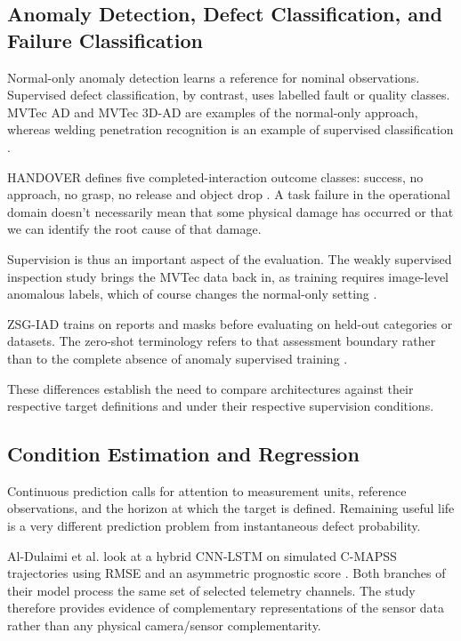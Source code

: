 \subsection{Anomaly Detection, Defect Classification, and Failure Classification}

Normal-only anomaly detection learns a reference for nominal observations. Supervised defect
classification, by contrast, uses labelled fault or quality classes. MVTec AD and MVTec 3D-AD are
examples of the normal-only approach, whereas welding penetration recognition is an example of
supervised classification \citep{Bergmann2019MVTec,Bergmann2022The,Hua2026Weld}.

HANDOVER defines five completed-interaction outcome classes: success, no approach, no grasp, no
release and object drop \citep{Thoduka2024Handover}. A task failure in the operational domain
doesn't necessarily mean that some physical damage has occurred or that we can identify the root
cause of that damage.

Supervision is thus an important aspect of the evaluation. The weakly supervised inspection study
brings the MVTec data back in, as training requires image-level anomalous labels, which of course
changes the normal-only setting \citep[PDF p.~8]{P035}.

ZSG-IAD trains on reports and masks before evaluating on held-out categories or datasets. The
zero-shot terminology refers to that assessment boundary rather than to the complete absence of
anomaly supervised training \citep[PDF pp.~6, 8--9]{P025}.

These differences establish the need to compare architectures against their respective target
definitions and under their respective supervision conditions.

\subsection{Condition Estimation and Regression}

Continuous prediction calls for attention to measurement units, reference observations, and the
horizon at which the target is defined. Remaining useful life is a very different prediction problem
from instantaneous defect probability.

Al-Dulaimi et al. look at a hybrid CNN-LSTM on simulated C-MAPSS trajectories using RMSE and an
asymmetric prognostic score \citep{AlDulaimi2019A}. Both branches of their model process the same
set of selected telemetry channels. The study therefore provides evidence of complementary
representations of the sensor data rather than any physical camera/sensor complementarity.

